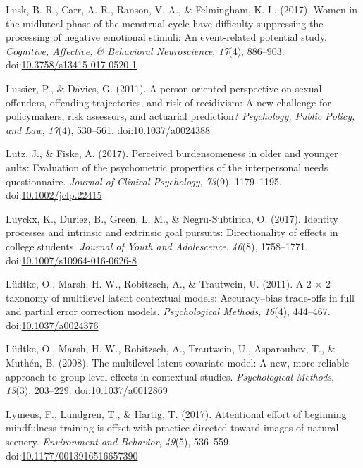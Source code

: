 \documentclass[english,man]{apa6}
\theoremstyle{definition}
\theoremstyle{definition}
\theoremstyle{definition}
\theoremstyle{remark}
\begin{document}
\hypertarget{ref-Lusk2017}{}
Lusk, B. R., Carr, A. R., Ranson, V. A., \& Felmingham, K. L. (2017).
Women in the midluteal phase of the menstrual cycle have difficulty
suppressing the processing of negative emotional stimuli: An
event-related potential study. \emph{Cognitive, Affective, \& Behavioral
Neuroscience}, \emph{17}(4), 886--903.
doi:\href{https://doi.org/10.3758/s13415-017-0520-1}{10.3758/s13415-017-0520-1}

\hypertarget{ref-Lussier2011}{}
Lussier, P., \& Davies, G. (2011). A person-oriented perspective on
sexual offenders, offending trajectories, and risk of recidivism: A new
challenge for policymakers, risk assessors, and actuarial prediction?
\emph{Psychology, Public Policy, and Law}, \emph{17}(4), 530--561.
doi:\href{https://doi.org/10.1037/a0024388}{10.1037/a0024388}

\hypertarget{ref-Lutz2017}{}
Lutz, J., \& Fiske, A. (2017). Perceived burdensomeness in older and
younger aults: Evaluation of the psychometric properties of the
interpersonal needs questionnaire. \emph{Journal of Clinical
Psychology}, \emph{73}(9), 1179--1195.
doi:\href{https://doi.org/10.1002/jclp.22415}{10.1002/jclp.22415}

\hypertarget{ref-Luyckx2017}{}
Luyckx, K., Duriez, B., Green, L. M., \& Negru-Subtirica, O. (2017).
Identity processes and intrinsic and extrinsic goal pursuits:
Directionality of effects in college students. \emph{Journal of Youth
and Adolescence}, \emph{46}(8), 1758--1771.
doi:\href{https://doi.org/10.1007/s10964-016-0626-8}{10.1007/s10964-016-0626-8}

\hypertarget{ref-Ludtke2011}{}
Lüdtke, O., Marsh, H. W., Robitzsch, A., \& Trautwein, U. (2011). A 2 ×
2 taxonomy of multilevel latent contextual models: Accuracy--bias
trade-offs in full and partial error correction models.
\emph{Psychological Methods}, \emph{16}(4), 444--467.
doi:\href{https://doi.org/10.1037/a0024376}{10.1037/a0024376}

\hypertarget{ref-Ludtke2008}{}
Lüdtke, O., Marsh, H. W., Robitzsch, A., Trautwein, U., Asparouhov, T.,
\& Muthén, B. (2008). The multilevel latent covariate model: A new, more
reliable approach to group-level effects in contextual studies.
\emph{Psychological Methods}, \emph{13}(3), 203--229.
doi:\href{https://doi.org/10.1037/a0012869}{10.1037/a0012869}

\hypertarget{ref-Lymeus2017}{}
Lymeus, F., Lundgren, T., \& Hartig, T. (2017). Attentional effort of
beginning mindfulness training is offset with practice directed toward
images of natural scenery. \emph{Environment and Behavior},
\emph{49}(5), 536--559.
doi:\href{https://doi.org/10.1177/0013916516657390}{10.1177/0013916516657390}
\end{document}
